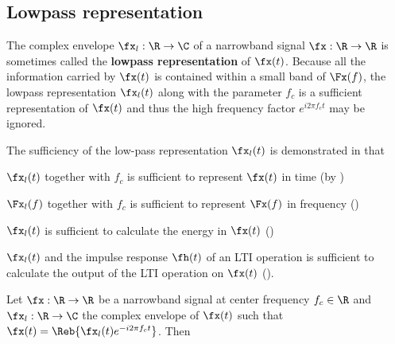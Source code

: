 \subsection{Lowpass representation}
The complex envelope $\fx_l:\R\to\C$ of a narrowband signal
$\fx:\R\to\R$ is sometimes called the {\bf lowpass representation}
of $\fx(t)$.
Because all the information carried by $\fx(t)$
is contained within a small band of $\Fx(f)$,
the lowpass representation $\fx_l(t)$ along with the parameter $f_c$
is a sufficient representation of $\fx(t)$
and thus the high frequency factor $e^{i2\pi f_c t}$ may be ignored.

The sufficiency of the low-pass representation $\fx_l(t)$
is demonstrated in that
\begin{enume}
   \item $\fx_l(t)$ together with $f_c$ is sufficient to represent
         $\fx(t)$ in time (by )
   \item $\Fx_l(f)$ together with $f_c$ is sufficient to represent
         $\Fx(f)$ in frequency ()
   \item $\fx_l(t)$ is sufficient to calculate the energy in $\fx(t)$
         ()
   \item $\fx_l(t)$ and the impulse response $\fh(t)$ of an LTI operation
         is sufficient to calculate the output of the LTI operation
         on $\fx(t)$ ().
\end{enume}
\begin{theorem}
\label{thm:xxl}
Let $\fx:\R\to\R$ be a narrowband signal at center frequency $f_c\in\R$
and $\fx_l:\R\to\C$ the complex envelope of $\fx(t)$ such that
  $\fx(t) = \Reb{\fx_l(t) e^{-i2\pi f_c t}}$.
Then
\end{theorem}
